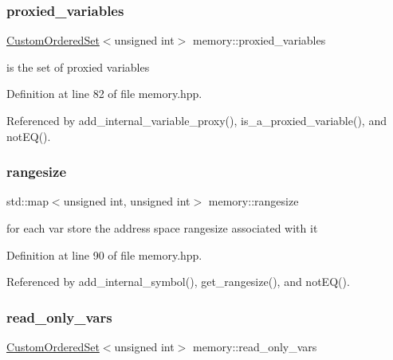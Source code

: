 \subsubsection{\texorpdfstring{proxied\+\_\+variables}{proxied\_variables}}
{\footnotesize\ttfamily \hyperlink{classCustomOrderedSet}{Custom\+Ordered\+Set}$<$unsigned int$>$ memory\+::proxied\+\_\+variables\hspace{0.3cm}{\ttfamily [private]}}



is the set of proxied variables 



Definition at line 82 of file memory.\+hpp.



Referenced by add\+\_\+internal\+\_\+variable\+\_\+proxy(), is\+\_\+a\+\_\+proxied\+\_\+variable(), and not\+E\+Q().

\mbox{\label{classmemory_a3c2f2a293a39a86fca2072848f852585}} 
\subsubsection{\texorpdfstring{rangesize}{rangesize}}
{\footnotesize\ttfamily std\+::map$<$unsigned int, unsigned int$>$ memory\+::rangesize\hspace{0.3cm}{\ttfamily [private]}}



for each var store the address space rangesize associated with it 



Definition at line 90 of file memory.\+hpp.



Referenced by add\+\_\+internal\+\_\+symbol(), get\+\_\+rangesize(), and not\+E\+Q().

\mbox{\label{classmemory_a65ec8ddee58a43fd84b238d5a79daf7d}} 
\subsubsection{\texorpdfstring{read\+\_\+only\+\_\+vars}{read\_only\_vars}}
{\footnotesize\ttfamily \hyperlink{classCustomOrderedSet}{Custom\+Ordered\+Set}$<$unsigned int$>$ memory\+::read\+\_\+only\+\_\+vars\hspace{0.3cm}{\ttfamily [private]}}



